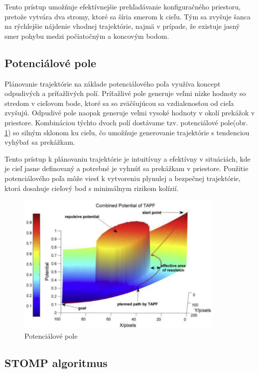 Tento prístup umožňuje efektívnejšie prehľadávanie konfiguračného priestoru, pretože vytvára dva stromy, ktoré sa šíria smerom k cieľu. Tým sa zvyšuje šanca na rýchlejšie nájdenie vhodnej trajektórie, najmä v prípade, že existuje jasný smer pohybu medzi počiatočným a koncovým bodom.



\subsection{Potenciálové pole}
\label{kap:2.4}

Plánovanie trajektórie na základe potenciálového poľa využíva koncept odpudivých a príťažlivých polí. Príťažlivé pole generuje veľmi nízke hodnoty so stredom v cieľovom bode, ktoré sa so zväčšujúcou sa vzdialenosťou od cieľa zvyšujú. Odpudivé pole naopak generuje veľmi vysoké hodnoty v okolí prekážok v priestore. Kombináciou týchto dvoch polí dostávame tzv. potenciálové pole(obr. \ref{OBRAZOK 1.2.4}) so silným sklonom ku cieľu, čo umožňuje generovanie trajektórie s tendenciou vyhýbať sa prekážkam.

Tento prístup k plánovaniu trajektórie je intuitívny a efektívny v situáciách, kde je cieľ jasne definovaný a potrebné je vyhnúť sa prekážkam v priestore. Použitie potenciálového poľa môže viesť k vytvoreniu plynulej a bezpečnej trajektórie, ktorá dosahuje cieľový bod s minimálnym rizikom kolízií.

\begin{figure}[h]
	\centering
	\includegraphics[width=100mm]{img/Potencialove_pole2.png}
	\caption{Potenciálové pole \cite{Potencialove_pole}}\label{OBRAZOK 1.2.4} 
\end{figure} 

\subsection{STOMP algoritmus}
\label{kap:2.5}

